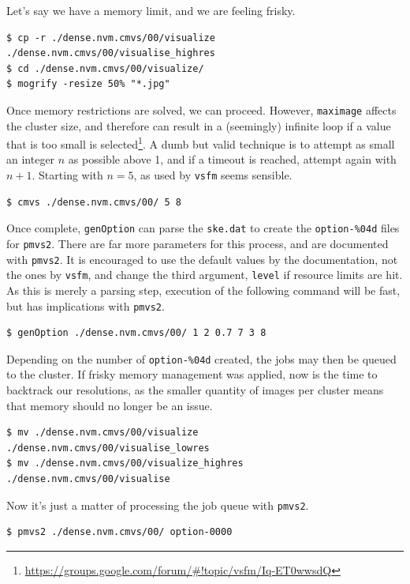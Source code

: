 \documentclass{article}
\begin{document}
Let's say we have a memory limit, and we are feeling frisky.

\begin{lstlisting}
$ cp -r ./dense.nvm.cmvs/00/visualize ./dense.nvm.cmvs/00/visualise_highres
$ cd ./dense.nvm.cmvs/00/visualize/
$ mogrify -resize 50% "*.jpg"
\end{lstlisting}

Once memory restrictions are solved, we can proceed. However, {\tt maximage} affects the cluster size, and therefore can result in a (seemingly) infinite loop if a value that is too small is selected\footnote{\url{https://groups.google.com/forum/\#!topic/vsfm/Iq-ET0wwsdQ}}. A dumb but valid technique is to attempt as small an integer $n$ as possible above 1, and if a timeout is reached, attempt again with $n+1$. Starting with $n=5$, as used by {\tt vsfm} seems sensible.

\begin{lstlisting}
$ cmvs ./dense.nvm.cmvs/00/ 5 8
\end{lstlisting}

Once complete, {\tt genOption} can parse the {\tt ske.dat} to create the {\tt option-\%04d} files for {\tt pmvs2}. There are far more parameters for this process, and are documented with {\tt pmvs2}. It is encouraged to use the default values by the documentation, not the ones by {\tt vsfm}, and change the third argument, {\tt level} if resource limits are hit. As this is merely a parsing step, execution of the following command will be fast, but has implications with {\tt pmvs2}.

\begin{lstlisting}
$ genOption ./dense.nvm.cmvs/00/ 1 2 0.7 7 3 8
\end{lstlisting}

Depending on the number of {\tt option-\%04d} created, the jobs may then be queued to the cluster. If frisky memory management was applied, now is the time to backtrack our resolutions, as the smaller quantity of images per cluster means that memory should no longer be an issue.

\begin{lstlisting}
$ mv ./dense.nvm.cmvs/00/visualize ./dense.nvm.cmvs/00/visualise_lowres
$ mv ./dense.nvm.cmvs/00/visualize_highres ./dense.nvm.cmvs/00/visualise
\end{lstlisting}

Now it's just a matter of processing the job queue with {\tt pmvs2}.

\begin{lstlisting}
$ pmvs2 ./dense.nvm.cmvs/00/ option-0000
\end{lstlisting}
\end{document}
